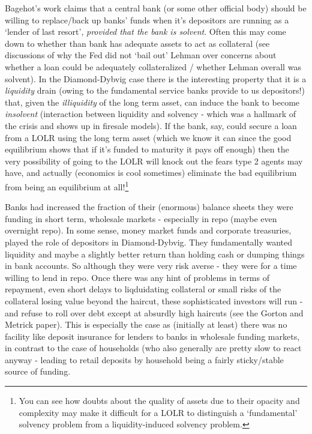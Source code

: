 \documentclass[authoryear,11pt]{elsarticle}
\begin{document}
Bagehot's work claims that a central bank (or some other official body) should be willing to replace/back up banks' funds when it's depositors are running as a `lender of last resort', \textit{provided that the bank is solvent}. Often this may come down to whether than bank has adequate assets to act as collateral (see discussions of why the Fed did not `bail out' Lehman over concerns about whether a loan could be adequately collateralized / whether Lehman overall was solvent). In the Diamond-Dybvig case there is the interesting property that it is a \textit{liquidity} drain (owing to the fundamental service banks provide to us depositors!) that, given the \textit{illiquidity} of the long term asset, can induce the bank to become \textit{insolvent} (interaction between liquidity and solvency - which was a hallmark of the crisis and shows up in firesale models). If the bank, say, could secure a loan from a LOLR using the long term asset (which we know it can since the good equilibrium shows that if it's funded to maturity it pays off enough) then the very possibility of going to the LOLR will knock out the fears type 2 agents may have, and actually (economics is cool sometimes) eliminate the bad equilibrium from being an equilibrium at all!\footnote{You can see how doubts about the quality of assets due to their opacity and complexity may make it difficult for a LOLR to distinguish a `fundamental' solvency problem from a liquidity-induced solvency problem.}

Banks had increased the fraction of their (enormous) balance sheets they were funding in short term, wholesale markets - especially in repo (maybe even overnight repo). In some sense, money market funds and corporate treasuries, played the role of depositors in Diamond-Dybvig. They fundamentally wanted liquidity and maybe a slightly better return than holding cash or dumping things in bank accounts. So although they were very risk averse - they were for a time willing to lend in repo. Once there was any hint of problems in terms of repayment, even short delays to liqduidating collateral or small risks of the collateral losing value beyond the haircut, these sophisticated investors will run - and refuse to roll over debt except at absurdly high haircuts (see the Gorton and Metrick paper). This is especially the case as (initially at least) there was no facility like deposit insurance for lenders to banks in wholesale funding markets, in contrast to the case of households (who also generally are pretty slow to react anyway - leading to retail deposits by household being a fairly sticky/stable source of funding.
\end{document}
